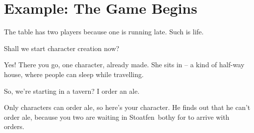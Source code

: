 \section{Example: The Game Begins}

\begin{multicols}{2}

\noindent
The table has two players because one is running late.
Such is life.

\begin{description}\sf
  \item[Player 1:]
  Shall we start character creation now?
  \item[\Glsentrytext{gm}:]
  Yes!
  There you go, one character, already made.
  She sits in  -- a kind of half-way house, where people can sleep while travelling.
  \item[Player 2:]
  So, we're starting in a tavern?
  I order an ale.
  \item[\Glsentrytext{gm}:]
  Only characters can order ale, so here's your character.
  He finds out that he can't order ale, because you two are waiting in Stoatfen~\Gls{bothy} for  to arrive with orders.


\end{description}
\end{multicols}
